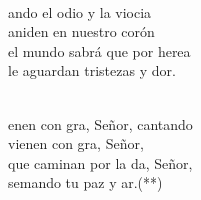 \begin{cancion}
	\jump\\
	ando el odio y la viocia\\
	aniden en nuestro corón\\
	el mundo sabrá que por herea\\
	le aguardan tristezas y dor.\\\jump\\
	\begin{chorus}%
	enen con gra, Señor, cantando\\
	vienen con gra, Señor,\\
	 que caminan por la da, Señor,\\
	semando tu paz y ar.(**)\\
	\end{chorus}%
	\jump\\
\end{cancion}%
